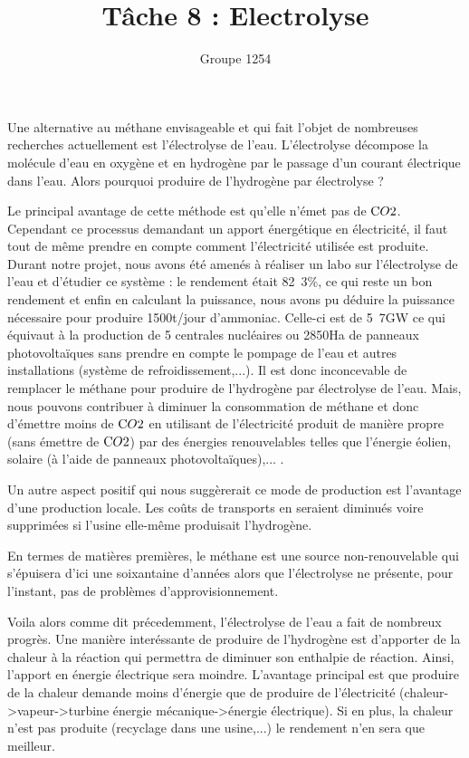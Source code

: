 \documentclass[10pt,a4paper]{article}
\title{Tâche 8 : Electrolyse}
\author{Groupe 1254}
\begin{document}
\maketitle

Une alternative au méthane envisageable et qui fait l'objet de nombreuses recherches actuellement est l’électrolyse de l'eau. L’électrolyse décompose la molécule d'eau en oxygène et en hydrogène par le passage d'un courant électrique dans l'eau. Alors pourquoi produire de l'hydrogène par électrolyse ? 

Le principal avantage de cette méthode est qu'elle n'émet pas de $\ce CO2$. Cependant ce processus demandant un apport énergétique en électricité, il faut tout de même prendre en compte comment l'électricité utilisée est produite. Durant notre projet, nous avons été amenés à réaliser un labo sur l’électrolyse de l'eau et d'étudier ce système : le rendement était \unit{82.3}{\%}, ce qui reste un bon rendement et enfin en calculant la puissance, nous avons pu déduire la puissance nécessaire pour produire \unit{1500}{t/jour} d'ammoniac. Celle-ci est de \unit{5.7}{GW} ce qui équivaut à la production de 5 centrales nucléaires ou \unit{2850}{Ha} de panneaux photovoltaïques sans prendre en compte le pompage de l'eau et autres installations (système de refroidissement,...). Il est donc inconcevable de remplacer le méthane pour produire de l'hydrogène par électrolyse de l'eau. Mais, nous pouvons contribuer à diminuer la consommation de méthane et donc d'émettre moins de $\ce CO2$ en utilisant de l’électricité produit de manière propre (sans émettre de $\ce CO2$) par des énergies renouvelables telles que l'énergie éolien, solaire (à l'aide de panneaux photovoltaïques),...  .

Un autre aspect positif qui nous suggèrerait ce mode de production est l'avantage d'une production locale. Les coûts de transports en seraient  diminués voire supprimées si l'usine elle-même produisait l'hydrogène. 

En termes de matières premières, le méthane est une source non-renouvelable qui s'épuisera d'ici une soixantaine d'années alors que l’électrolyse ne présente, pour l'instant, pas de problèmes d'approvisionnement.

Voila alors comme dit précedemment, l'électrolyse de l'eau a fait de nombreux progrès. Une manière interéssante de produire de l'hydrogène est d'apporter de la chaleur à la réaction qui permettra de diminuer son enthalpie de réaction. Ainsi, l'apport en énergie électrique sera moindre. L'avantage principal est que produire de la chaleur demande moins d'énergie que de produire de l'électricité (chaleur->vapeur->turbine énergie mécanique->énergie électrique). Si en plus, la chaleur n'est pas produite (recyclage dans une usine,...) le rendement n'en sera que meilleur.   
\end{document}
